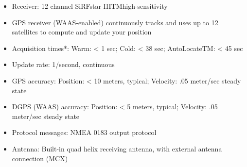 \begin{itemize}
\begin{itemize}
			\item Receiver: 12 channel SiRFstar IIITMhigh-sensitivity 
			\item GPS receiver (WAAS-enabled) continuously tracks and uses up to 12 satellites to compute and update your position 
			\item Acquisition times*: Warm: < 1 sec; Cold: < 38 sec; AutoLocateTM: < 45 sec 
			\item Update rate: 1/second, continuous 
			\item GPS accuracy: Position: < 10 meters, typical; Velocity: .05 meter/sec steady state 
			\item DGPS (WAAS) accuracy: Position: < 5 meters, typical; Velocity: .05 meter/sec steady state 
			\item Protocol messages: NMEA 0183 output protocol 
			\item Antenna: Built-in quad helix receiving antenna, with external antenna connection (MCX)
		\end{itemize}
\end{itemize}

